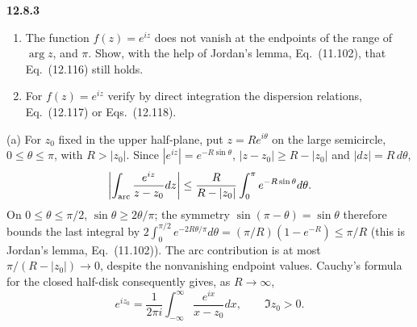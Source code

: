 \par\bigskip
\noindent\textbf{12.8.3}\quad
\begin{enumerate}
\item[(a)] The function $f(z)=e^{iz}$ does not vanish at the endpoints of the
  range of $\arg z$,  and $\pi$. Show, with the help of Jordan's lemma,
  Eq.~(11.102), that Eq.~(12.116) still holds.
\item[(b)] For $f(z)=e^{iz}$ verify by direct integration the dispersion
  relations, Eq.~(12.117) or Eqs.~(12.118).
\end{enumerate}
\solution
{}
(a) For $z_0$ fixed in the upper half-plane, put $z=Re^{i\theta}$ on
the large semicircle, $0\le\theta\le\pi$, with $R>|z_0|$. Since
$|e^{iz}|=e^{-R\sin\theta}$, $|z-z_0|\ge R-|z_0|$ and $|dz|=R\,d\theta$,
\[
\left|\int_{\rm arc}\frac{e^{iz}}{z-z_0}dz\right|
\le\frac R{R-|z_0|}\int_0^\pi e^{-R\sin\theta}d\theta.
\]
On $0\le\theta\le\pi/2$, $\sin\theta\ge2\theta/\pi$; the symmetry
$\sin(\pi-\theta)=\sin\theta$ therefore bounds the last integral by
$2\int_0^{\pi/2}e^{-2R\theta/\pi}d\theta=(\pi/R)(1-e^{-R})\le\pi/R$
(this is Jordan's lemma, Eq.~(11.102)).
The arc contribution is at most $\pi/(R-|z_0|)\to0$, despite the
nonvanishing endpoint values. Cauchy's formula for the closed half-disk
consequently gives, as $R\to\infty$,
\[
\boxed{e^{iz_0}=\frac1{2\pi i}\int_{-\infty}^{\infty}
\frac{e^{ix}}{x-z_0}dx},\qquad\Im z_0>0.
\]

